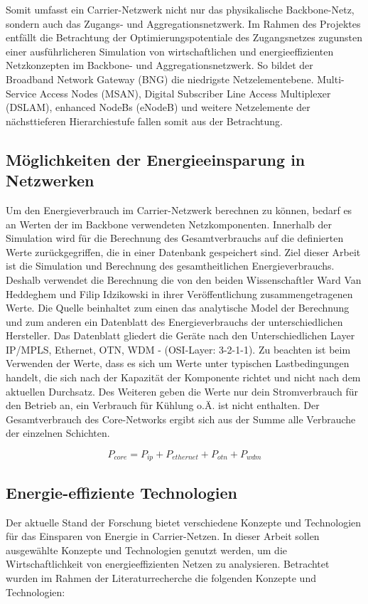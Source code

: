 \documentclass[12pt,titlepage]{article}
\begin{document}
Somit umfasst ein Carrier-Netzwerk nicht nur das physikalische Backbone-Netz, sondern auch das Zugangs- und Aggregationsnetzwerk. Im Rahmen des Projektes entfällt die Betrachtung der Optimierungspotentiale des Zugangsnetzes zugunsten einer aus\-führ\-lich\-eren Simulation von wirtschaftlichen und energieeffizienten Netzkonzepten im Backbone- und Aggregationsnetzwerk. So bildet der Broadband Network Gateway (BNG) die niedrigste Netzelementebene. Multi-Service Access Nodes (MSAN), Digital Subscriber Line Access Multiplexer (DSLAM), enhanced NodeBs (eNodeB) und weitere Netzelemente der nächsttieferen Hierarchiestufe fallen somit aus der Betrachtung.
\subsection{Möglichkeiten der Energieeinsparung in Netzwerken}
Um den Energieverbrauch im Carrier-Netzwerk berechnen zu können, bedarf es an Werten der im Backbone verwendeten Netzkomponenten. Innerhalb der Simulation wird für die Berechnung des Gesamtverbrauchs auf die definierten Werte zurückgegriffen, die in einer Datenbank gespeichert sind. Ziel dieser Arbeit ist die Simulation und Berechnung des gesamtheitlichen Energieverbrauchs. Deshalb verwendet die Berechnung die von den beiden Wissenschaftler Ward Van Heddeghem und Filip Idzikowski in ihrer Veröffentlichung \cite{vanhedde} zusammengetragenen Werte. Die Quelle beinhaltet zum einen das analytische Model der Berechnung und zum anderen ein Datenblatt \cite{vanhsheet} des Energieverbrauchs der unterschiedlichen Hersteller. Das Datenblatt gliedert die Geräte nach den Unterschiedlichen Layer IP/MPLS, Ethernet, OTN, WDM - (OSI-Layer: 3-2-1-1). Zu beachten ist beim Verwenden der Werte, dass es sich um Werte unter typischen Lastbedingungen handelt, die sich nach der Kapazität der Komponente richtet und nicht nach dem aktuellen Durchsatz. Des Weiteren geben die Werte nur dein Stromverbrauch für den Betrieb an, ein Verbrauch für Kühlung o.Ä. ist nicht enthalten.
Der Gesamtverbrauch des Core-Networks ergibt sich aus der Summe alle Verbrauche der einzelnen Schichten. 

\begin{equation}
P_{core} = P_{ip} + P_{ethernet} + P_{otn} + P_{wdm}
\end{equation}


\subsection{Energie-effiziente Technologien}
Der aktuelle Stand der Forschung bietet verschiedene Konzepte und Technologien für das Einsparen von Energie in Carrier-Netzen. In dieser Arbeit sollen ausgewählte Konzepte und Technologien genutzt werden, um die Wirtschaftlichkeit von energieeffizienten Netzen zu analysieren. Betrachtet wurden im Rahmen der Literaturrecherche die folgenden Konzepte und Technologien: 
\end{document}
